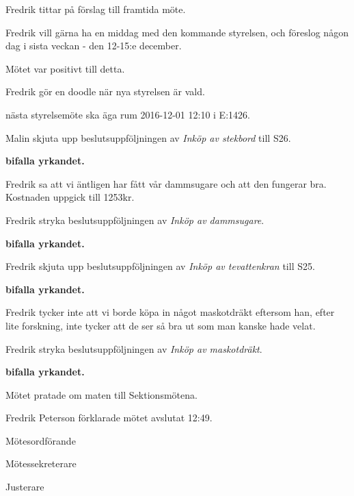 \documentclass[10pt]{article}
\def\mo{Fredrik Peterson}
\def\ms{Erik Månsson}
\def\ji{Dalia Khairallah}
\begin{document}
\begin{paragrafer}
Fredrik tittar på förslag till framtida möte.

Fredrik vill gärna ha en middag med den kommande styrelsen, och föreslog någon dag i sista veckan - den 12-15:e december.

Mötet var positivt till detta.

Fredrik gör en doodle när nya styrelsen är vald.

{\Mba} nästa styrelsemöte ska äga rum 2016-12-01 12:10 i E:1426.


Malin \ypa skjuta upp beslutsuppföljningen av \emph{Inköp av stekbord} till S26.

\textbf{\Mba bifalla yrkandet.}

Fredrik sa att vi äntligen har fått vår dammsugare och att den fungerar bra. Kostnaden uppgick till 1253kr.

Fredrik \ypa stryka beslutsuppföljningen av \emph{Inköp av dammsugare}.

\textbf{\Mba bifalla yrkandet.}

Fredrik \ypa skjuta upp beslutsuppföljningen av \emph{Inköp av tevattenkran} till S25.

\textbf{\Mba bifalla yrkandet.}

Fredrik tycker inte att vi borde köpa in något maskotdräkt eftersom han, efter lite forskning, inte tycker att de ser så bra ut som man kanske hade velat.

Fredrik \ypa stryka beslutsuppföljningen av \emph{Inköp av maskotdräkt}.

\textbf{\Mba bifalla yrkandet.}

Mötet pratade om maten till Sektionsmötena.

{\mo} förklarade mötet avslutat 12:49.

\end{paragrafer}

\hidesignfoot
\begin{signatures}{3}
\signature{\mo}{Mötesordförande}
\signature{\ms}{Mötessekreterare}
\signature{\ji}{Justerare}
\end{signatures}
\end{document}
